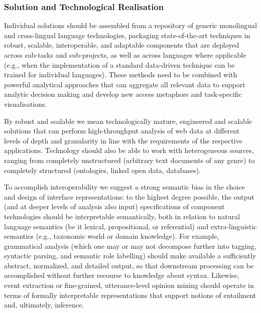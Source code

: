 \documentclass[10pt, plain]{../../metanetpaper}
\begin{document}
\begin{multicols}{2}
\subsubsection{Solution and Technological Realisation}
\label{sec:solut-techn-real-pt2}

Individual solutions should be assembled from a repository of generic monolingual and cross-lingual language technologies, packaging state-of-the-art techniques in robust, scalable, interoperable, and adaptable components that are deployed across sub-tasks and sub-projects, as well as across languages where applicable (e.g., when the implementation of a standard data-driven technique can be trained for individual languages). These methods need to be combined with powerful analytical approaches that can aggregate all relevant data to support analytic decision making and develop new access metaphors and task-specific visualisations.
 
By robust and scalable we mean technologically mature, engineered and scalable solutions that can perform high-throughput analysis of web data at different levels of depth and granularity in line with the requirements of the respective applications. Technology should also be able to work with heterogeneous sources, ranging from completely unstructured (arbitrary text documents of any genre) to completely structured (ontologies, linked open data, databases).

To accomplish interoperability we suggest a strong semantic bias in the choice and design of interface representations: to the highest degree possible, the output (and at deeper levels of analysis also input) specifications of component technologies should be interpretable semantically, both in relation to natural language semantics (be it lexical, propositional, or referential) and extra-linguistic semantics (e.g., taxonomic world or domain knowledge). For example, grammatical analysis (which one may or may not decompose further into tagging, syntactic parsing, and semantic role labelling) should make available a sufficiently abstract, normalized, and detailed output, so that downstream processing can be accomplished without further recourse to knowledge about syntax. Likewise, event extraction or fine-grained, utterance-level opinion mining should operate in terms of formally interpretable representations that support notions of entailment and, ultimately, inference.


\end{multicols}
\end{document}
